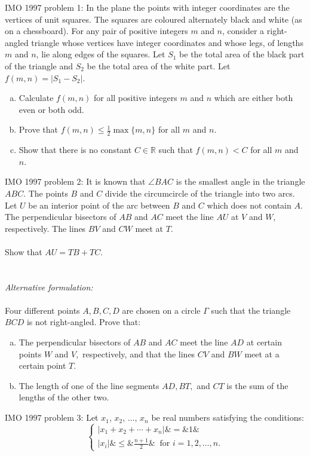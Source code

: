 IMO 1997 problem 1:  In the plane the points with integer coordinates are the vertices of unit squares. The squares are coloured alternately black and white (as on a chessboard). For any pair of positive integers $ m$ and $ n$, consider a right-angled triangle whose vertices have integer coordinates and whose legs, of lengths $ m$ and $ n$, lie along edges of the squares. Let $ S_1$ be the total area of the black part of the triangle and $ S_2$ be the total area of the white part. Let $ f(m,n) = | S_1 - S_2 |$.
\begin{enumerate}[a)]
  \item Calculate $ f(m,n)$ for all positive integers $ m$ and $ n$ which are either both even or both odd.
  \item Prove that $ f(m,n) \leq \frac 12 \max \{m,n \}$ for all $ m$ and $ n$.
  \item Show that there is no constant $ C\in\mathbb{R}$ such that $ f(m,n) < C$ for all $ m$ and $ n$.
\end{enumerate} 
IMO 1997 problem 2:  It is known that $ \angle BAC$ is the smallest angle in the triangle $ ABC$. The points $ B$ and $ C$ divide the circumcircle of the triangle into two arcs. Let $ U$ be an interior point of the arc between $ B$ and $ C$ which does not contain $ A$. The perpendicular bisectors of $ AB$ and $ AC$ meet the line $ AU$ at $ V$ and $ W$, respectively. The lines $ BV$ and $ CW$ meet at $ T$. \\\\
Show that $ AU = TB + TC$. \\\\\\
\textit{Alternative formulation:} \\\\
Four different points $ A,B,C,D$ are chosen on a circle $ \Gamma$ such that the triangle $ BCD$ is not right-angled. Prove that:
\begin{enumerate}[(a)]
  \item The perpendicular bisectors of $ AB$ and $ AC$ meet the line $ AD$ at certain points $ W$ and $ V,$ respectively, and that the lines $ CV$ and $ BW$ meet at a certain point $ T.$
  \item The length of one of the line segments $ AD, BT,$ and $ CT$ is the sum of the lengths of the other two.
\end{enumerate} 
IMO 1997 problem 3:  Let $ x_1$, $ x_2$, $ \ldots$, $ x_n$  be real numbers satisfying the conditions:
\[
\left\{
\begin{array}{cccc} |x_1 + x_2 + \cdots + x_n | \& = \& 1 \& \ \\
|x_i| \& \leq \& \displaystyle \frac {n + 1}{2} \& \ \textrm{ for }i = 1, 2, \ldots , n. \end{array}
\right.
\]
